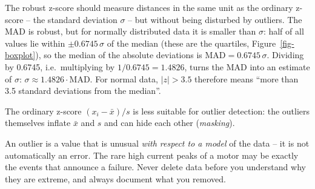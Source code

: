 \documentclass[
  letterpaper,
  DIV=11,
  numbers=noendperiod]{scrreprt}
\begin{document}
\begin{tcolorbox}[enhanced jigsaw, left=2mm, title=\textcolor{quarto-callout-note-color}{\faInfo}\hspace{0.5em}{Extension: where does the factor 1.4826 come from?}, opacityback=0, breakable, rightrule=.15mm, arc=.35mm, toptitle=1mm, colbacktitle=quarto-callout-note-color!10!white, opacitybacktitle=0.6, coltitle=black, colframe=quarto-callout-note-color-frame, bottomrule=.15mm, leftrule=.75mm, bottomtitle=1mm, titlerule=0mm, toprule=.15mm, colback=white]

The robust z-score should measure distances in the same unit as the
ordinary z-score -- the standard deviation \(\sigma\) -- but without
being disturbed by outliers. The MAD is robust, but for normally
distributed data it is smaller than \(\sigma\): half of all values lie
within \(\pm 0.6745\,\sigma\) of the median (these are the quartiles,
Figure~\ref{fig-boxplot}), so the median of the absolute deviations is
\(\text{MAD} = 0.6745\,\sigma\). Dividing by 0.6745, i.e.~multiplying by
\(1/0.6745 = 1.4826\), turns the MAD into an estimate of \(\sigma\):
\(\sigma \approx 1.4826 \cdot \text{MAD}\). For normal data,
\(|z| > 3.5\) therefore means ``more than 3.5 standard deviations from
the median''.

\end{tcolorbox}

The ordinary z-score \((x_i - \bar x)/s\) is less suitable for outlier
detection: the outliers themselves inflate \(\bar x\) and \(s\) and can
hide each other (\emph{masking}).

\begin{tcolorbox}[enhanced jigsaw, left=2mm, title=\textcolor{quarto-callout-warning-color}{\faExclamationTriangle}\hspace{0.5em}{Pitfall: deleting ``outliers'' automatically}, opacityback=0, breakable, rightrule=.15mm, arc=.35mm, toptitle=1mm, colbacktitle=quarto-callout-warning-color!10!white, opacitybacktitle=0.6, coltitle=black, colframe=quarto-callout-warning-color-frame, bottomrule=.15mm, leftrule=.75mm, bottomtitle=1mm, titlerule=0mm, toprule=.15mm, colback=white]

An outlier is a value that is unusual \emph{with respect to a model} of
the data -- it is not automatically an error. The rare high current
peaks of a motor may be exactly the events that announce a failure.
Never delete data before you understand why they are extreme, and always
document what you removed.

\end{tcolorbox}
\end{document}
